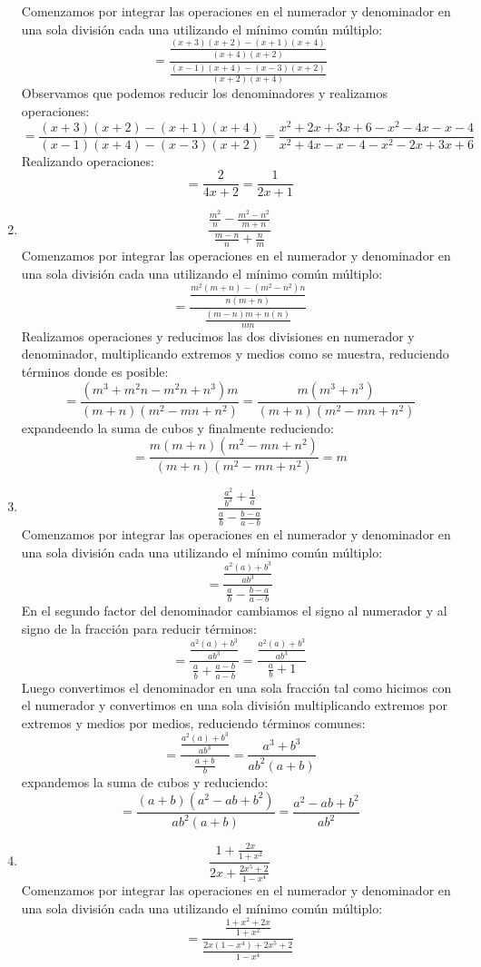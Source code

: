 \documentclass[12pt]{article}
\begin{document}
\begin{enumerate}[label=\bfseries Ejercicio \arabic*:]
Comenzamos por integrar las operaciones en el numerador y denominador en una sola división cada una utilizando el mínimo común múltiplo:
$$= \frac{\frac{(x + 3)(x + 2) - (x + 1)(x + 4)}{(x + 4)(x + 2)}}{\frac{(x - 1)(x + 4) - (x - 3)(x + 2)}{(x + 2)(x + 4)}}$$
Observamos que podemos reducir los denominadores y realizamos operaciones:
$$= \frac{(x + 3)(x + 2) - (x + 1)(x + 4)}{(x - 1)(x + 4) - (x - 3)(x + 2)} = \frac{x^2 + 2x + 3x +6 -  x^2 - 4x - x - 4}{x^2 + 4x - x - 4 - x^2 - 2x + 3x + 6}$$
Realizando operaciones:
$$= \frac{2}{4x + 2} = \frac{1}{2x + 1}$$
  \item $$\frac{\frac{m^2}{n} - \frac{m^2 - n^2}{m + n}}{\frac{m - n}{n} + \frac{n}{m}}$$
Comenzamos por integrar las operaciones en el numerador y denominador en una sola división cada una utilizando el mínimo común múltiplo:
$$= \frac{\frac{m^2(m + n) - (m^2 - n^2)n}{n(m + n)}}{\frac{(m - n)m + n(n)}{nm}}$$
Realizamos operaciones y reducimos las dos divisiones en numerador y denominador, multiplicando extremos y medios como se muestra, reduciendo términos donde es posible:
$$= \frac{(m^3 + m^2n - m^2n + n^3)m}{(m + n)(m^2 - mn + n^2)} = \frac{m(m^3 + n^3)}{(m + n)(m^2 - mn + n^2)}$$
expandeendo la suma de cubos y finalmente reduciendo:
$$= \frac{m(m + n)(m^2 - mn + n^2)}{(m + n)(m^2 - mn + n^2)} = m$$
  \item $$\frac{\frac{a^2}{b^3} + \frac{1}{a}}{\frac{a}{b} - \frac{b - a}{a - b}}$$
Comenzamos por integrar las operaciones en el numerador y denominador en una sola división cada una utilizando el mínimo común múltiplo:
$$= \frac{\frac{a^2(a) + b^3}{ab^3}}{\frac{a}{b} - \frac{b - a}{a - b}}$$
En el segundo factor del denominador cambiamos el signo al numerador y al signo de la fracción para reducir términos:
$$= \frac{\frac{a^2(a) + b^3}{ab^3}}{\frac{a}{b} + \frac{a - b}{a - b}} = \frac{\frac{a^2(a) + b^3}{ab^3}}{\frac{a}{b} + 1}$$
Luego convertimos el denominador en una sola fracción tal como hicimos con el numerador y convertimos en una sola división multiplicando extremos por extremos y medios por medios, reduciendo términos comunes:
$$= \frac{\frac{a^2(a) + b^3}{ab^3}}{\frac{a + b}{b}} = \frac{a^3 + b^3}{ab^2(a + b)}$$
expandemos la suma de cubos y reduciendo:
$$= \frac{(a + b)(a^2 - ab + b^2)}{ab^2(a + b)} = \frac{a^2 - ab + b^2}{ab^2}$$
  \item $$\frac{1 + \frac{2x}{1 + x^2}}{2x + \frac{2x^5 + 2}{1 - x^4}}$$
Comenzamos por integrar las operaciones en el numerador y denominador en una sola división cada una utilizando el mínimo común múltiplo:
$$= \frac{\frac{1 + x^2 + 2x}{1 + x^2}}{\frac{2x(1 - x^4)+ 2x^5 + 2}{1 - x^4}}$$

\end{enumerate}
\end{document}
